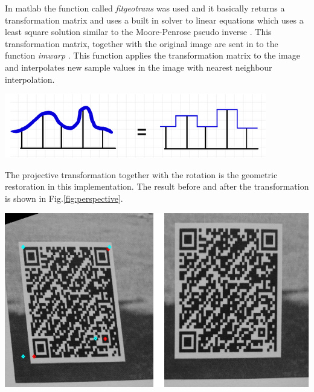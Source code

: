\documentclass[12pt,a4paper]{article}
\newenvironment{Figure}
  {\par\medskip\noindent\minipage{\linewidth}}
  {\endminipage\par\medskip}
\begin{document}
In matlab the function called \textit{fitgeotrans} \cite{fitgeotrans} was used and it basically returns a transformation matrix and uses a built in solver to linear equations which uses a least square solution similar to the Moore-Penrose pseudo inverse \cite{mldivide}. This transformation matrix, together with the original image are sent in to the function \textit{imwarp} \cite{imwarp}. This function applies the transformation matrix to the image and interpolates new sample values in the image with nearest neighbour interpolation. 
\begin{Figure}
  \centering
    \includegraphics[width=1\linewidth]{./img/nearestnei.png}
\end{Figure}
The projective transformation together with the rotation is the geometric restoration in this implementation. The result before and after the transformation is shown in Fig.\ref{fig:perspective}.

\begin{Figure}
  \centering
    \includegraphics[width=1\linewidth]{./img/perspectivefinal.png}
\end{Figure}
\end{document}
